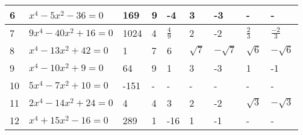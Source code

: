 \begin{landscape}
\begin{solution}
\begin{tabular}{|l|l|l|l|l|l|l|l|l|}
6  & ${{x}^{4}}-5{{x}^{2}}-36=0$                                                   & 169                                           & 9                                                                & -4                            & 3                     & -3                     & -                     & -                      \\ \hline
7  & $9{{x}^{4}}-40{{x}^{2}}+16=0$                                                 & 1024                                          & 4                                                                & $\frac{4}{9}$                 & 2                     & -2                     & $\frac{2}{3}$         & $\frac{-2}{3}$         \\ \hline
8  & ${{x}^{4}}-13{{x}^{2}}+42=0$                                                  & 1                                             & 7                                                                & 6                             & $\sqrt{7}$            & $-\sqrt{7}$            & $\sqrt{6}$            & $-\sqrt{6}$            \\ \hline
9  & ${{x}^{4}}-10{{x}^{2}}+9=0$                                                   & 64                                            & 9                                                                & 1                             & 3                     & -3                     & 1                     & -1                     \\ \hline
10 & $5{{x}^{4}}-7{{x}^{2}}+10=0$                                                  & -151                                          & -                                                                & -                             & -                     & -                      & -                     & -                      \\ \hline
11 & $2{{x}^{4}}-14{{x}^{2}}+24=0$                                                 & 4                                             & 4                                                                & 3                             & 2                     & -2                     & $\sqrt{3}$            & $-\sqrt{3}$            \\ \hline
12 & ${{x}^{4}}+15{{x}^{2}}-16=0$                                                  & 289                                           & 1                                                                & -16                           & 1                     & -1                     & -                     & -                      \\ \hline

\end{tabular}
\end{solution}
\end{landscape}

